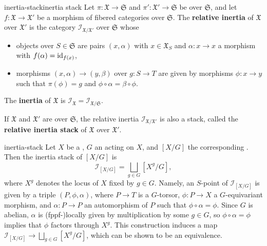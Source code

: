 \begin{topic}{inertia-stack}{inertia stack}
    Let $\pi : \mathfrak{X} \to \mathfrak{S}$ and $\pi' : \mathfrak{X}' \to \mathfrak{S}$ be  over $\mathfrak{S}$, and let $f : \mathfrak{X} \to \mathfrak{X}'$ be a morphism of fibered categories over $\mathfrak{S}$. The \textbf{relative inertia} of $\mathfrak{X}$ over $\mathfrak{X}'$ is the category $\mathcal{I}_{\mathfrak{X}/\mathfrak{X}'}$ over $\mathfrak{S}$ whose
    \begin{itemize}
        \item objects over $S \in \mathfrak{S}$ are pairs $(x, \alpha)$ with $x \in \mathfrak{X}_S$ and $\alpha : x \to x$ a morphism with $f(\alpha) = \textup{id}_{f(x)}$,
        \item morphisms $(x, \alpha) \to (y, \beta)$ over $g : S \to T$ are given by morphisms $\phi : x \to y$ such that $\pi(\phi) = g$ and $\phi \circ \alpha = \beta \circ \phi$.
    \end{itemize}
    The \textbf{inertia} of $\mathfrak{X}$ is $\mathcal{I}_\mathfrak{X} = \mathcal{I}_{\mathfrak{X}/\mathfrak{S}}$.
    
    If $\mathfrak{X}$ and $\mathfrak{X}'$ are  over $\mathfrak{S}$, the relative inertia $\mathcal{I}_{\mathfrak{X}/\mathfrak{X}'}$ is also a stack, called the \textbf{relative inertia stack} of $\mathfrak{X}$ over $\mathfrak{X}'$.
\end{topic}

\begin{example}{inertia-stack}
    Let $X$ be a , $G$ an  acting on $X$, and $[X/G]$ the corresponding . Then the inertia stack of $[X/G]$ is
    \[ \mathcal{I}_{[X/G]} = \bigsqcup_{g \in G} [X^g / G] , \]
    where $X^g$ denotes the locus of $X$ fixed by $g \in G$. Namely, an $S$-point of $\mathcal{I}_{[X/G]}$ is given by a triple $(P, \phi, \alpha)$, where $P \to T$ is a $G$-torsor, $\phi : P \to X$ a $G$-equivariant morphism, and $\alpha : P \to P$ an automorphism of $P$ such that $\phi \circ \alpha = \phi$. Since $G$ is abelian, $\alpha$ is (fppf-)locally given by multiplication by some $g \in G$, so $\phi \circ \alpha = \phi$ implies that $\phi$ factors through $X^g$. This construction induces a map $\mathcal{I}_{[X/G]} \to \bigsqcup_{g \in G} [X^g/G]$, which can be shown to be an equivalence.
\end{example}


